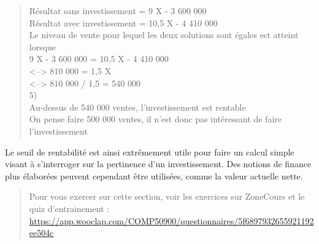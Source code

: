 \documentclass{tufte-handout}
\begin{document}
\begin{enumerate}
\begin{verse}
Résultat sans investissement  = 9 X - 3 600 000\\
Résultat avec investissement = 10,5 X - 4 410 000\\
Le niveau de vente pour lequel les deux solutions sont égales est atteint lorsque\\
9 X - 3 600 000 = 10,5 X - 4 410 000\\
<--> 810 000 = 1,5 X\\
<--> 810 000 / 1,5 = 540 000\\
5)\\
Au-dessus de 540 000 ventes, l'investissement est rentable\\
On pense faire 500 000 ventes, il n'est donc pas intéressant de faire l'investissement\\
\end{verse}

Le seuil de rentabilité est ainsi extrêmement utile pour faire un calcul simple visant à s'interroger sur la pertinence d'un investissement. Des notions de finance plus élaborées peuvent cependant être utilisées, comme la valeur actuelle nette.\\

\begin{quote}
Pour vous exercer sur cette section, voir les exercices sur ZoneCours et le quiz d'entrainement : \url{https://app.wooclap.com/COMP50900/questionnaires/5f6897932655921192ee504c}\\
\end{quote}
\end{enumerate}
\end{document}
